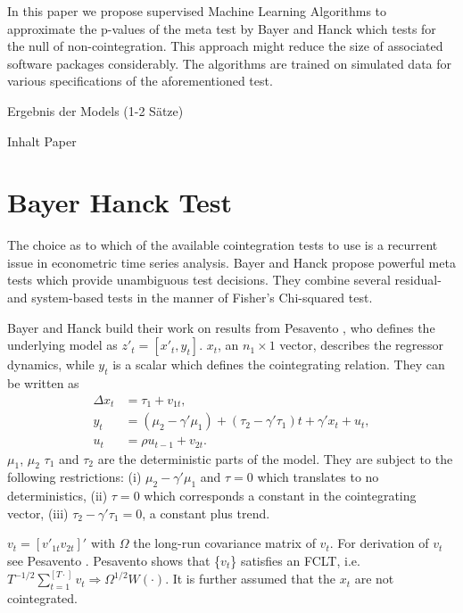\documentclass[12pt,a4paper]{article}
\begin{document}
In this paper we propose supervised Machine Learning Algorithms to
approximate the p-values of the meta test by Bayer and Hanck
\autocite*{Bayerhanck_2012} which tests for the null of
non-cointegration. This approach might reduce the size of associated
software packages considerably. The algorithms are trained on simulated
data for various specifications of the aforementioned test.

Ergebnis der Models (1-2 Sätze)

Inhalt Paper

\hypertarget{bayer-hanck-test}{%
\section{Bayer Hanck Test}\label{bayer-hanck-test}}

The choice as to which of the available cointegration tests to use is a
recurrent issue in econometric time series analysis. Bayer and Hanck
\autocite*{Bayerhanck_2012} propose powerful meta tests which provide
unambiguous test decisions. They combine several residual- and
system-based tests in the manner of Fisher's \autocite*{Fisher_1932}
Chi-squared test.

Bayer and Hanck build their work on results from Pesavento
\autocite*{Pesavento_2004}, who defines the underlying model as
\(z'_t = [x'_t, y_t]\). \(x_t\), an \(n_1 \times 1\) vector, describes
the regressor dynamics, while \(y_t\) is a scalar which defines the
cointegrating relation. They can be written as \begin{align}
\Delta x_t &= \tau_1 + v_{1t}, \\
y_t &= (\mu_2 - \gamma' \mu_1) + (\tau_2 - \gamma' \tau_1) t + \gamma' x_t + u_t, \\
u_t &= \rho u_{t-1} + v_{2t}.
\end{align} \(\mu_1\), \(\mu_2\) \(\tau_1\) and \(\tau_2\) are the
deterministic parts of the model. They are subject to the following
restrictions: (i) \(\mu_2 - \gamma' \mu_1\) and \(\tau = 0\) which
translates to no deterministics, (ii) \(\tau = 0\) which corresponds a
constant in the cointegrating vector, (iii)
\(\tau_2 - \gamma' \tau_1 = 0\), a constant plus trend.

\(v_t = [v'_{1t} v_{2t}]'\) with \(\Omega\) the long-run covariance
matrix of \(v_t\). For derivation of \(v_t\) see Pesavento
\autocite*{Pesavento_2004}. Pesavento shows that \{\(v_t\)\} satisfies
an FCLT,
i.e.~\(T^{-1/2} \sum^{[T \cdot]}_{t=1} v_t \Rightarrow \Omega^{1/2} W(\cdot)\).
It is further assumed that the \(x_t\) are not cointegrated.
\end{document}
